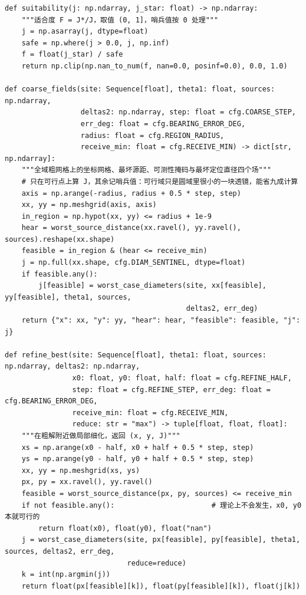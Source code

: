 \documentclass[UTF8, zihao=5,AutoFakeBold=2]{ctexart}
\begin{document}
\begin{lstlisting}
def suitability(j: np.ndarray, j_star: float) -> np.ndarray:
    """适合度 F = J*/J，取值 (0, 1]，哨兵值按 0 处理"""
    j = np.asarray(j, dtype=float)
    safe = np.where(j > 0.0, j, np.inf)
    f = float(j_star) / safe
    return np.clip(np.nan_to_num(f, nan=0.0, posinf=0.0), 0.0, 1.0)

def coarse_fields(site: Sequence[float], theta1: float, sources: np.ndarray,
                  deltas2: np.ndarray, step: float = cfg.COARSE_STEP,
                  err_deg: float = cfg.BEARING_ERROR_DEG,
                  radius: float = cfg.REGION_RADIUS,
                  receive_min: float = cfg.RECEIVE_MIN) -> dict[str, np.ndarray]:
    """全域粗网格上的坐标网格、最坏源距、可测性掩码与最坏定位直径四个场"""
    # 只在可行点上算 J，其余记哨兵值：可行域只是圆域里很小的一块透镜，能省九成计算
    axis = np.arange(-radius, radius + 0.5 * step, step)
    xx, yy = np.meshgrid(axis, axis)
    in_region = np.hypot(xx, yy) <= radius + 1e-9
    hear = worst_source_distance(xx.ravel(), yy.ravel(), sources).reshape(xx.shape)
    feasible = in_region & (hear <= receive_min)
    j = np.full(xx.shape, cfg.DIAM_SENTINEL, dtype=float)
    if feasible.any():
        j[feasible] = worst_case_diameters(site, xx[feasible], yy[feasible], theta1, sources,
                                           deltas2, err_deg)
    return {"x": xx, "y": yy, "hear": hear, "feasible": feasible, "j": j}

def refine_best(site: Sequence[float], theta1: float, sources: np.ndarray, deltas2: np.ndarray,
                x0: float, y0: float, half: float = cfg.REFINE_HALF,
                step: float = cfg.REFINE_STEP, err_deg: float = cfg.BEARING_ERROR_DEG,
                receive_min: float = cfg.RECEIVE_MIN,
                reduce: str = "max") -> tuple[float, float, float]:
    """在粗解附近做局部细化，返回 (x, y, J)"""
    xs = np.arange(x0 - half, x0 + half + 0.5 * step, step)
    ys = np.arange(y0 - half, y0 + half + 0.5 * step, step)
    xx, yy = np.meshgrid(xs, ys)
    px, py = xx.ravel(), yy.ravel()
    feasible = worst_source_distance(px, py, sources) <= receive_min
    if not feasible.any():                       # 理论上不会发生，x0, y0 本就可行的
        return float(x0), float(y0), float("nan")
    j = worst_case_diameters(site, px[feasible], py[feasible], theta1, sources, deltas2, err_deg,
                             reduce=reduce)
    k = int(np.argmin(j))
    return float(px[feasible][k]), float(py[feasible][k]), float(j[k])
	\end{lstlisting}
\end{document}
